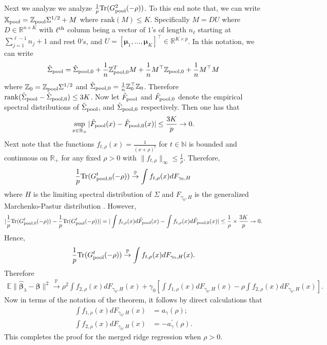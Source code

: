 \documentclass{article}
\theoremstyle{plain}
\theoremstyle{remark}
\def \bbeta{\boldsymbol{\beta}}
\def \bbeta{\boldsymbol{\beta}}
\def \Xm {\mathbb{X}_{\rm pool}}
\def \tr {\mathrm{Tr}}
\def \E{\mathbb{E}}
\def \P{\mathbb{P}}
\def \bmu{\pmb{\mu}}
\begin{document}
Next we analyze we analyze $\frac 1p\tr (G_{\rm pool}^2(-\rho))$. To this end note that, we can write $\Xm=\mathbb{Z}_{\rm pool}\Sigma^{1/2}+M$ where $\mathrm{rank}(M)\leq K$. Specifically $M=DU$ where $D\in \mathbb{R}^{n\times K}$ with $\ell^{\rm th}$ column being a vector of $1$'s of length $n_{\ell}$ starting at $\sum_{j=1}^{\ell-1} n_j+1$ and rest $0$'s, and $U=[\bmu_1,\ldots,\bmu_K]^\top\in \mathbb{R}^{K \times p}$. In this notation, we can write $$\hat{\Sigma}_{\rm pool}=\hat{\Sigma}_{\rm pool,0}+\frac{1}{n}\mathbb{Z}_{\rm pool,0}^T M+\frac{1}{n}M^\top\mathbb{Z}_{\rm pool,0}+\frac{1}{n}M^\top M$$ where $\mathbb{Z}_0=\mathbb{Z}_{\rm pool}\Sigma^{1/2}$ and $\hat{\Sigma}_{\rm pool,0}=\frac 1n \mathbb{Z}_0^\top \mathbb{Z}_0$. Therefore $\mathrm{rank}(\hat{\Sigma}_{\rm pool}-\hat{\Sigma}_{\rm pool,0})\leq 3K$. Now let $\hat{F}_{\rm pool}$ and $\hat{F}_{\rm pool,0}$ denote the empirical spectral distributions of  $\hat{\Sigma}_{\rm pool}$, and $\hat{\Sigma}_{\rm pool,0}$ respectively. Then \citep[Theorem A.43]{bai2010spectral} one has that
\begin{align*}
    \sup\limits_{x\in \mathbb{R}_+}|\hat{F}_{\rm pool}(x)-\hat{F}_{\rm pool,0}(x)|\leq \frac{3K}{p}\to 0.
\end{align*}
Next note that the functions $f_{t,\rho}(x)=\frac{1}{(x+\rho)^t}$ for $t\in \mathbb{N}$ is bounded and continuous on $\mathbb{R}_+$ for any fixed $\rho>0$ with $\|f_{t,\rho}\|_{\infty}\leq \frac{1}{\rho}$. Therefore, 
\begin{align*}
    \frac{1}{p}\tr(G^t_{\rm pool,0}(-\rho))\stackrel{\P}{\to} \int f_{t,\rho}(x)dF_{\gamma_0,H}
\end{align*}
where $H$ is the limiting spectral distribution of $\Sigma$ and $F_{\gamma_0,H}$ is the generalized Marchenko-Pastur distribution \citep{bai2010spectral}. However, 
\begin{align*}
    |\frac{1}{p}\tr(G^t_{\rm pool,0}(-\rho))-\frac{1}{p}\tr(G^t_{\rm pool}(-\rho))|=|\int f_{t,\rho}(x)d\hat{F}_{\rm pool}(x)-\int f_{t,\rho}(x)d\hat{F}_{\rm pool,0}(x) |\leq \frac{1}{\rho}\times \frac{3K}{p}\to 0.
\end{align*}
Hence,
\begin{align*}
    \frac{1}{p}\tr(G^t_{\rm pool}(-\rho))\stackrel{\P}{\to} \int f_{t,\rho}(x)dF_{\gamma_0,H}(x).
\end{align*}
Therefore
\begin{align*}
    \E\|\hat{\bbeta}_{\lambda}-\bbeta\|^2\stackrel{\P}{\to} \rho^2 \int f_{2,\rho}(x)dF_{\gamma_0,H}(x)+\gamma_0\left[\int f_{1,\rho}(x)dF_{\gamma_0,H}(x)-\rho \int f_{2,\rho}(x)dF_{\gamma_0,H}(x)\right].
\end{align*}
Now in terms of the notation of the theorem, it follows by direct calculations that
\begin{align*}
    \int f_{1,\rho}(x)dF_{\gamma_0,H}(x)&=a_{\gamma}(\rho);\\
    \int f_{2,\rho}(x)dF_{\gamma_0,H}(x)&=-a^{'}_{\gamma}(\rho).
\end{align*}
This completes the proof for the merged ridge regression when $\rho>0$.
\end{document}
